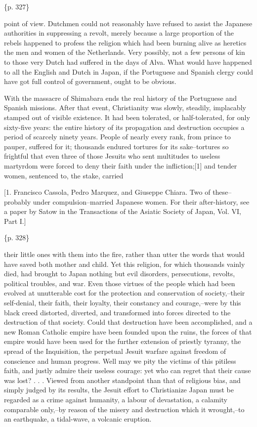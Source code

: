 \{p. 327\}

point of view. Dutchmen could not reasonably have refused to assist the Japanese authorities in suppressing a revolt, merely because a large proportion of the rebels happened to profess the religion which had been burning alive as heretics the men and women of the Netherlands. Very possibly, not a few persons of kin to those very Dutch had suffered in the days of Alva. What would have happened to all the English and Dutch in Japan, if the Portuguese and Spanish clergy could have got full control of government, ought to be obvious.



With the massacre of Shimabara ends the real history of the Portuguese and Spanish missions. After that event, Christianity was slowly, steadily, implacably stamped out of visible existence. It had been tolerated, or half-tolerated, for only sixty-five years: the entire history of its propagation and destruction occupies a period of scarcely ninety years. People of nearly every rank, from prince to pauper, suffered for it; thousands endured tortures for its sake--tortures so frightful that even three of those Jesuits who sent multitudes to useless martyrdom were forced to deny their faith under the infliction;[1] and tender women, sentenced to, the stake, carried

[1. Francisco Cassola, Pedro Marquez, and Giuseppe Chiara. Two of these--probably under compulsion--married Japanese women. For their after-history, see a paper by Satow in the Transactions of the Asiatic Society of Japan, Vol. VI, Part I.]

\{p. 328\}

their little ones with them into the fire, rather than utter the words that would have saved both mother and child. Yet this religion, for which thousands vainly died, had brought to Japan nothing but evil disorders, persecutions, revolts, political troubles, and war. Even those virtues of the people which had been evolved at unutterable cost for the protection and conservation of society,--their self-denial, their faith, their loyalty, their constancy and courage,--were by this black creed distorted, diverted, and transformed into forces directed to the destruction of that society. Could that destruction have been accomplished, and a new Roman Catholic empire have been founded upon the ruins, the forces of that empire would have been used for the further extension of priestly tyranny, the spread of the Inquisition, the perpetual Jesuit warfare against freedom of conscience and human progress. Well may we pity the victims of this pitiless faith, and justly admire their useless courage: yet who can regret that their cause was lost? . . . Viewed from another standpoint than that of religious bias, and simply judged by its results, the Jesuit effort to Christianize Japan must be regarded as a crime against humanity, a labour of devastation, a calamity comparable only,--by reason of the misery and destruction which it wrought,--to an earthquake, a tidal-wave, a volcanic eruption.

